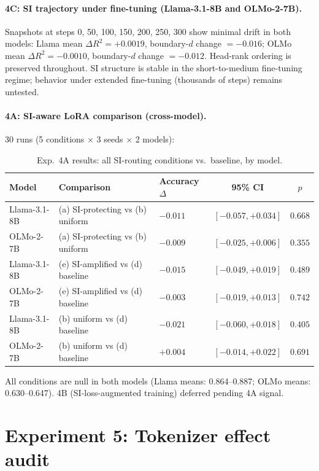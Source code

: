 \documentclass{article}
\begin{document}
\paragraph{4C: SI trajectory under fine-tuning (Llama-3.1-8B and OLMo-2-7B).} Snapshots at
steps 0, 50, 100, 150, 200, 250, 300 show minimal drift in both models: Llama mean
$\Delta R^2 = +0.0019$, boundary-$d$ change $= -0.016$; OLMo mean $\Delta R^2 = -0.0010$,
boundary-$d$ change $= -0.012$. Head-rank ordering is preserved throughout. SI structure
is stable in the short-to-medium fine-tuning regime; behavior under extended fine-tuning
(thousands of steps) remains untested.

\paragraph{4A: SI-aware LoRA comparison (cross-model).} 30 runs
(5 conditions $\times$ 3 seeds $\times$ 2 models):

\begin{table}[htbp]
    \caption{Exp.~4A results: all SI-routing conditions vs.\ baseline, by model.}
    \centering
    \small
    \begin{tabular}{lllcc}
        \toprule
        Model & Comparison & Accuracy $\Delta$ & 95\% CI & $p$ \\
        \midrule
        Llama-3.1-8B & (a) SI-protecting vs (b) uniform & $-0.011$ & $[-0.057, +0.034]$ & $0.668$ \\
        OLMo-2-7B & (a) SI-protecting vs (b) uniform & $-0.009$ & $[-0.025, +0.006]$ & $0.355$ \\
        Llama-3.1-8B & (e) SI-amplified vs (d) baseline & $-0.015$ & $[-0.049, +0.019]$ & $0.489$ \\
        OLMo-2-7B & (e) SI-amplified vs (d) baseline & $-0.003$ & $[-0.019, +0.013]$ & $0.742$ \\
        Llama-3.1-8B & (b) uniform vs (d) baseline & $-0.021$ & $[-0.060, +0.018]$ & $0.405$ \\
        OLMo-2-7B & (b) uniform vs (d) baseline & $+0.004$ & $[-0.014, +0.022]$ & $0.691$ \\
        \bottomrule
    \end{tabular}
\end{table}

All conditions are null in both models (Llama means: 0.864--0.887; OLMo means: 0.630--0.647).
4B (SI-loss-augmented training) deferred pending 4A signal.

\section{Experiment 5: Tokenizer effect audit}
\label{app:exp5}
\end{document}
